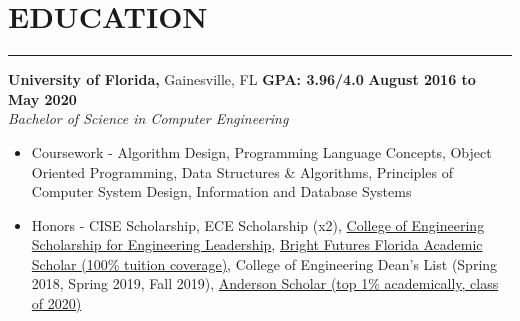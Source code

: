 \section*{EDUCATION}
		\hrule \relax
		\vspace{.4cm}
		
		\noindent \textbf{University of Florida,} Gainesville, FL
		\hfill\textbf{GPA: 3.96/4.0}
		\hfill\textbf{August 2016 to May 2020}\\
		\textit{Bachelor of Science in Computer Engineering}
		\begin{itemize}[noitemsep,nolistsep, label = {-}]
			\item  Coursework - 
											Algorithm Design,
											Programming Language Concepts,
											Object Oriented Programming,
											Data Structures \& Algorithms,
											Principles of Computer System Design,
											Information and Database Systems
			\item  Honors - 
											CISE Scholarship,
											ECE Scholarship (x2),
											\href{https://www.eng.ufl.edu/leadership/students/scholarships/thomas-o-hunter-leadership/}
													{College of Engineering Scholarship for Engineering Leadership},
											\href{https://www.sfa.ufl.edu/types-of-aid/bright-futures/}
													{Bright Futures Florida Academic Scholar (100\% tuition coverage)},
											College of Engineering Dean\rq s List (Spring 2018, Spring 2019, Fall 2019),
											\href{https://sites.clas.ufl.edu/clas-main/undergraduate/anderson-scholars/anderson-scholars-listing/}
													{Anderson Scholar (top 1\% academically, class of 2020)}
		\end{itemize}
		
		\vspace{.20cm}